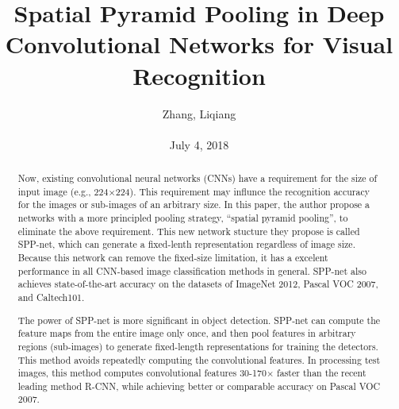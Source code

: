 \documentclass[10pt,twocolumn,letterpaper]{article}
\title{\textbf{Spatial Pyramid Pooling in Deep Convolutional Networks for Visual Recognition}}
\author{Zhang, Liqiang\\\\July 4, 2018}
\begin{document}
\maketitle
\par
\begin{abstract}
Now, existing convolutional neural networks (CNNs) have a requirement for the size of input image (e.g., 224$\times$224). This requirement may
influnce the recognition accuracy for the images or sub-images of an arbitrary size. In this paper, the author propose a networks with a more principled pooling strategy, ``spatial pyramid pooling'', to eliminate the above requirement. This new network stucture they propose is called SPP-net, which can generate a fixed-lenth representation regardless of image size. Because this network can remove the fixed-size limitation, it has a excelent performance in all CNN-based image classification
methods in general. SPP-net also achieves state-of-the-art accuracy on the datasets of ImageNet 2012, Pascal VOC 2007, and Caltech101.
\par
The power of SPP-net is more significant in object detection. SPP-net can compute the feature maps from the entire image only once, and then pool features in arbitrary regions (sub-images) to generate fixed-length  representations for training the detectors. This method avoids repeatedly computing the convolutional features. In processing test  images, this method computes convolutional features 30-170$\times$ faster than the recent leading method R-CNN, while achieving better or comparable accuracy on Pascal VOC 2007.
\end{abstract}
\end{document}
